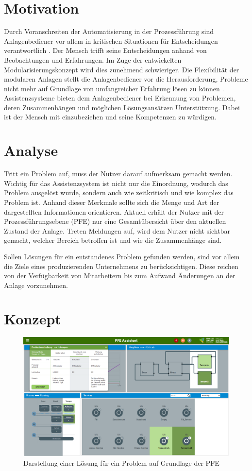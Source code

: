\documentclass{ifaPoster}
\begin{document}
\section{Motivation}
Durch Voranschreiten der Automatisierung in der Prozessführung sind Anlagenbediener vor allem in kritischen Situationen für Entscheidungen verantwortlich \cite{bainbridget_ironies_1983}. Der Mensch trifft seine Entscheidungen anhand von Beobachtungen und Erfahrungen. Im Zuge der entwickelten Modularisierungskonzept wird dies zunehmend schwieriger. Die Flexibilität der modularen Anlagen stellt die Anlagenbediener vor die Herausforderung, Probleme nicht mehr auf Grundlage von umfangreicher Erfahrung lösen zu können \cite{mueller_2018}. Assistenzsysteme bieten dem Anlagenbediener bei Erkennung von Problemen, deren Zusammenhängen und möglichen Lösungsansätzen Unterstützung. Dabei ist der Mensch mit einzubeziehen und seine Kompetenzen zu würdigen.

\section{Analyse}
Tritt ein Problem auf, muss der Nutzer darauf aufmerksam gemacht werden. Wichtig für das Assistenzsystem ist nicht nur die Einordnung, wodurch das Problem ausgelöst wurde, sondern auch wie zeitkritisch und wie komplex das Problem ist. Anhand dieser Merkmale sollte sich die Menge und Art der dargestellten Informationen orientieren. Aktuell erhält der Nutzer mit der Prozessführungsebene (PFE) nur eine Gesamtübersicht über den aktuellen Zustand der Anlage. Treten Meldungen auf, wird dem Nutzer nicht sichtbar gemacht, welcher Bereich betroffen ist und wie die Zusammenhänge sind.

Sollen Lösungen für ein entstandenes Problem gefunden werden, sind vor allem die Ziele eines produzierenden Unternehmens zu berücksichtigen. Diese reichen von der Verfügbarkeit von Mitarbeitern bis zum Aufwand Änderungen an der Anlage vorzunehmen.

\section{Konzept}
\begin{figure}[htbp]
\centering
\includegraphics[scale=0.4]{DA_files/Prototyp-PFE-Loesung2.png}
\caption{Darstellung einer Lösung für ein Problem auf Grundlage der PFE}
\label{PFE-Loesungen}
\end{figure}
\end{document}
